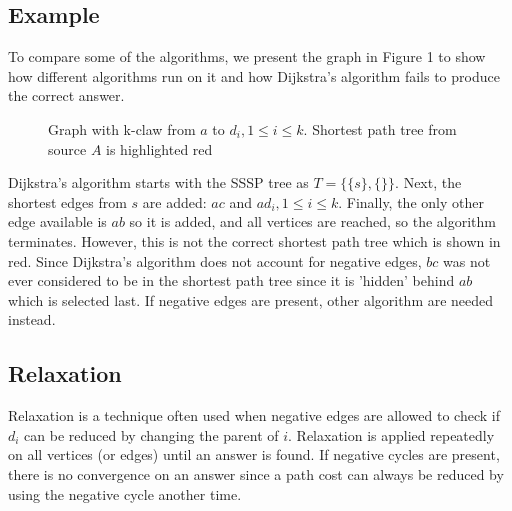 \documentclass{article}
\begin{document}
\subsection{Example}
To compare some of the algorithms, we present the graph in Figure 1 to show how different algorithms run on it and how Dijkstra's algorithm fails to produce the correct answer.
\begin{figure}
	\centering
\caption{Graph with k-claw from $a$ to $d_i, 1 \leq i \leq k$. Shortest path tree from source $A$ is highlighted red}
\end{figure}
Dijkstra's algorithm starts with the SSSP tree as $T = \{\{s\}, \{\}\}$. Next, the shortest edges from $s$ are added: $ac$ and $ad_i, 1 \leq i \leq k$. Finally, the only other edge available is $ab$ so it is added, and all vertices are reached, so the algorithm terminates. However, this is not the correct shortest path tree which is shown in red. Since Dijkstra's algorithm does not account for negative edges, $bc$ was not ever considered to be in the shortest path tree since it is 'hidden' behind $ab$ which is selected last. If negative edges are present, other algorithm are needed instead.

\subsection{Relaxation}
Relaxation is a technique often used when negative edges are allowed to check if $d_i$ can be reduced by changing the parent of $i$. Relaxation is applied repeatedly on all vertices (or edges) until an answer is found. If negative cycles are present, there is no convergence on an answer since a path cost can always be reduced by using the negative cycle another time.
\end{document}
